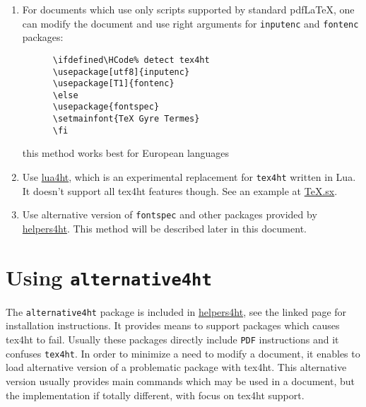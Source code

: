 \documentclass{article}
\begin{document}
\begin{enumerate}
  \item For documents which use only scripts supported by standard pdf\LaTeX,
    one can modify the document and use right arguments for \texttt{inputenc}
    and \texttt{fontenc} packages:

    \begin{verbatim}
      \ifdefined\HCode% detect tex4ht
      \usepackage[utf8]{inputenc}
      \usepackage[T1]{fontenc}
      \else
      \usepackage{fontspec}
      \setmainfont{TeX Gyre Termes}
      \fi
    \end{verbatim}

    this method works best for European languages

  \item Use \href{https://github.com/michal-h21/lua4ht}{lua4ht}, which is an
    experimental replacement for \texttt{tex4ht} written in Lua. It doesn't
    support all tex4ht features though. See an example at
    \href{http://tex.stackexchange.com/a/253889/2891}{TeX.sx}.

  \item Use alternative version of \texttt{fontspec} and other packages
    provided by \href{https://github.com/michal-h21/helpers4ht}{helpers4ht}.
    This method will be described later in this document.


\end{enumerate}

\section{Using \texttt{alternative4ht}}

The \texttt{alternative4ht} package is included in
\href{https://github.com/michal-h21/helpers4ht}{helpers4ht}, see the linked
page for installation instructions. It  provides means to support packages
which causes tex4ht to fail. Usually these packages directly include
\texttt{PDF} instructions and it confuses \texttt{tex4ht}. In order to minimize
a need to modify a document, it enables to load alternative version of a
problematic package with tex4ht. This alternative version usually provides main
commands which may be used in a document, but the implementation if totally
different, with focus on tex4ht support.
\end{document}
